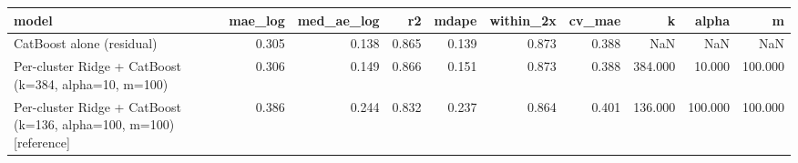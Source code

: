 \begin{tabular}{lrrrrrrrrr}
\toprule
model & mae_log & med_ae_log & r2 & mdape & within_2x & cv_mae & k & alpha & m \\
\midrule
CatBoost alone (residual) & 0.305 & 0.138 & 0.865 & 0.139 & 0.873 & 0.388 & NaN & NaN & NaN \\
Per-cluster Ridge + CatBoost (k=384, alpha=10, m=100) & 0.306 & 0.149 & 0.866 & 0.151 & 0.873 & 0.388 & 384.000 & 10.000 & 100.000 \\
Per-cluster Ridge + CatBoost (k=136, alpha=100, m=100) [reference] & 0.386 & 0.244 & 0.832 & 0.237 & 0.864 & 0.401 & 136.000 & 100.000 & 100.000 \\
\bottomrule
\end{tabular}
